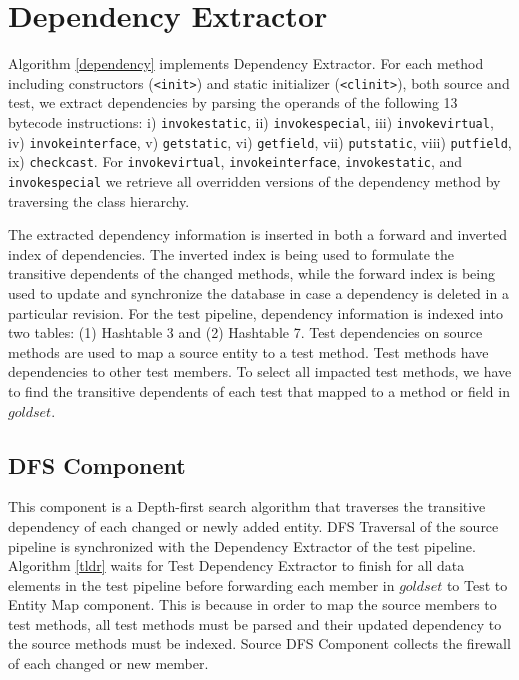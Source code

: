 \section{ Dependency Extractor}

\noindent
Algorithm \ref{dependency} implements Dependency Extractor. For each method including constructors (\texttt{<init>}) and static initializer (\texttt{<clinit>}), both source and test, we extract dependencies by parsing the operands of the following 13 bytecode instructions: i) \texttt{invokestatic}, ii) \texttt{invokespecial}, iii) \texttt{invokevirtual}, iv) \texttt{invokeinterface}, v) \texttt{getstatic}, vi) \texttt{getfield}, vii) \texttt{putstatic}, viii) \texttt{putfield}, ix) \texttt{checkcast}. For \texttt{invokevirtual}, \texttt{invokeinterface}, \texttt{invokestatic}, and \texttt{invokespecial} we retrieve all overridden versions of the dependency method by traversing the class hierarchy. 

The extracted dependency information is inserted in both a forward and inverted index of dependencies. The inverted index is being used to formulate the transitive dependents of the changed methods, while the forward index is being used to update and synchronize the database in case a dependency is deleted in a particular revision. For the test pipeline, dependency information is indexed into two tables: (1) Hashtable 3 and (2) Hashtable 7. Test dependencies on source methods are used to map a source entity to a test method. Test methods have dependencies to other test members. To select all impacted test methods, we have to find the transitive dependents of each test that mapped to a method or field in $goldset$. 


\vspace*{0.2cm}
\noindent
\subsection{ DFS Component}

\noindent
This component is a Depth-first search algorithm that traverses the transitive dependency of each changed or newly added entity. DFS Traversal of the source pipeline is synchronized with the Dependency Extractor of the test pipeline. Algorithm \ref{tldr} waits for Test Dependency Extractor to finish for all data elements in the test pipeline before forwarding each member in $goldset$ to Test to Entity Map component. This is because in order to map the source members to test methods, all test methods must be parsed and their updated dependency to the source methods must be indexed. Source DFS Component collects the firewall of each changed or new member. 


